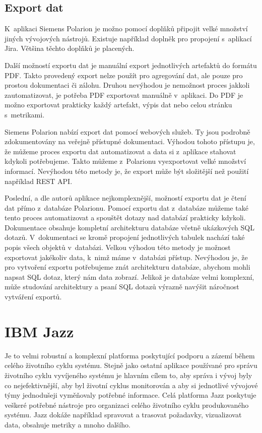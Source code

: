 \documentclass[czech,master]{diploma}
\begin{document}
\subsection{Export dat}
K~aplikaci Siemens Polarion je možno pomocí doplňků připojit velké množství jiných vývojových nástrojů. Existuje například doplněk pro propojení s~aplikací Jira. Většina těchto doplňků je placených. \cite{ref:polarion_extensions}

Další možností exportu dat je manuální export jednotlivých artefaktů do formátu PDF. Takto provedený export nelze použít pro agregování dat, ale pouze pro prostou dokumentaci či zálohu. Druhou nevýhodou je nemožnost proces jakkoli zautomatizovat, je potřeba PDF exportovat manuálně v~aplikaci. Do PDF je možno exportovat prakticky každý artefakt, výpis dat nebo celou stránku s~metrikami.

Siemens Polarion nabízí export dat pomocí webových služeb. Ty jsou podrobně zdokumentovány na veřejně přístupné dokumentaci. \cite{ref:polarion_documentation} Výhodou tohoto přístupu je, že můžeme proces exportu dat automatizovat a data si z~aplikace stahovat kdykoli potřebujeme. Takto můžeme z~Polarionu vyexportovat velké množství informací. Nevýhodou této metody je, že export může být složitější než použití například REST API.

Poslední, a dle autorů aplikace nejkomplexnější, možností exportu dat je čtení dat přímo z~databáze Polarionu. Pomocí exportu dat z~databáze můžeme také tento proces automatizovat a spouštět dotazy nad databází prakticky kdykoli. Dokumentace obsahuje kompletní architekturu databáze včetně ukázkových SQL dotazů. \cite{ref:polarion_documentation} V~dokumentaci se kromě propojení jednotlivých tabulek nachází také popis všech objektů v~databázi. Velkou výhodou této metody je možnost exportovat jakékoliv data, k~nimž máme v~databázi přístup. Nevýhodou je, že pro vytvoření exportu potřebujeme znát architekturu databáze, abychom mohli napsat SQL dotaz, který nám data zobrazí. Jelikož je databáze velmi komplexní, může studování architektury a psaní SQL dotazů výrazně navýšit náročnost vytváření exportů.

\section{IBM Jazz}
Je to velmi robustní a komplexní platforma poskytující podporu a zázemí během celého životního cyklu systému. Stejně jako ostatní aplikace používané pro správu životního cyklu vyvíjeného systému je hlavním cílem to, aby správa i vývoj byly co nejefektivnější, aby byl životní cyklus monitorován a aby si jednotlivé vývojové týmy jednodušeji vyměňovaly potřebné informace. Celá platforma Jazz poskytuje veškeré potřebné nástroje pro organizaci celého životního cyklu produkovaného systému. Jazz dokáže například spravovat a trasovat požadavky, vizualizovat data, obsahuje metriky a mnoho dalšího. \cite{ref:jazz}
\end{document}

